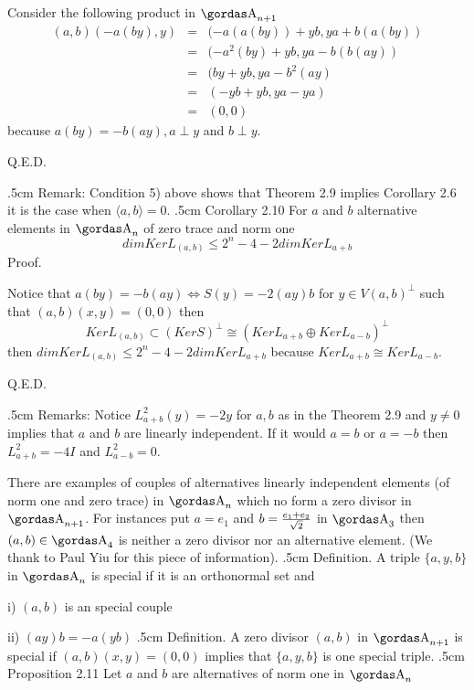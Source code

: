 Consider the following product in $\a_{n+1}$
\begin{eqnarray*}
(a,b)(-a(by),y)&=&(-a(a(by))+yb,ya+b(a(by))\\
&=&(-a^{2}(by)+yb,ya-b(b(ay))\\
&=&(by+yb,ya-b^{2}(ay)\\
&=&(-yb+yb, ya-ya)\\
&=&(0,0)
\end{eqnarray*}
because $a(by)=-b(ay), a\perp y$ and $b\perp y$.
\begin{flushright}
Q.E.D.
\end{flushright}
\vglue.5cm
\noindent
{\bsbf Remark:} Condition 5) above shows that Theorem 2.9 implies Corollary 
2.6 it is the case when $\langle a,b\rangle=0$.
\vglue.5cm
\noindent
{\bsbf Corollary 2.10} For $a$ and $b$ alternative elements in $\a_{n}$ of
zero trace and norm one
$$dim Ker L_{(a,b)}\le 2^{n}-4-2 dim Ker L_{a+b}$$
\newpage
\noindent
{\bsbf Proof.} 
\par 
Notice that $a(by)=-b(ay)\Leftrightarrow S(y)=-2(ay)b$ for
$y\in V(a,b)^{\perp}$ such that $(a,b)(x,y)=(0,0)$ then
$$Ker L_{(a,b)}\subset (Ker S)^{\perp}\cong (Ker L_{a+b}\oplus Ker L_{a-b})^{\perp}$$
then $dim Ker L_{(a,b)}\le 2^{n}-4-2 dim Ker L_{a+b}$ because 
$Ker L_{a+b}\cong Ker L_{a-b}$.
\begin{flushright}
Q.E.D.
\end{flushright}
\vglue.5cm
\noindent
{\bsbf Remarks:} Notice $L^{2}_{a+b}(y)=-2y$ for $a,b$ as in the Theorem 2.9
and $y\neq 0$ implies that $a$ and $b$ are linearly independent. If it would
$a=b$ or $a=-b$ then $L^{2}_{a+b}=-4I$ and $L^{2}_{a-b}=0$.
\par 
There are examples of couples of alternatives 
linearly independent elements (of norm one and zero 
trace) in $\a_{n}$
which no form a zero divisor in $\a_{n+1}$. For instances put $a=e_{1}$
and $b={ e_{1}+e_{2}\over  \sqrt {2 }}$ in $\a_{3}$ then $(a,b)\in \a_{4}$ is neither a
zero divisor nor an alternative element. (We thank to Paul Yiu for this piece 
of information).
\vglue.5cm
\noindent
{\bsbf Definition.} A triple 
$\{a,y,b\}$ in $\a_{n}$ is special if it is an
orthonormal set and 
\par 
i) $(a,b)$ is an special couple
\par 
ii) $(ay)b =-a(yb)$
\vglue.5cm
\noindent
{\bsbf Definition.} A zero divisor $(a,b)$ in $\a_{n+1}$ is special if 
$(a,b)(x,y)=(0,0)$ implies that $\{a,y,b\}$ is one special triple.
\vglue.5cm
\noindent
{\bsbf Proposition 2.11} Let $a$ and $b$ are alternatives of norm one in $\a_{n}$
